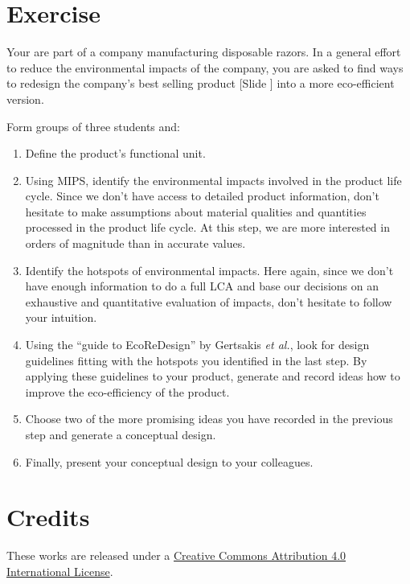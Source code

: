 \documentclass{article}
\newcounter{slide}
\newcounter{exercise}
\begin{document}
\section{Exercise}
\label{sec:exercise}
{\color{PineGreen}
Your are part of a company manufacturing disposable razors. In a general effort to reduce the environmental impacts of the company, you are asked to find ways to redesign the company's best selling product {\color{blue}[Slide ]} into a more eco-efficient version. 

Form groups of three students and:
\begin{enumerate}
	\item Define the product's functional unit. 
	\item Using MIPS, identify the environmental impacts involved in the product life cycle. Since we don't have access to detailed product information, don't hesitate to make assumptions about material qualities and quantities processed in the product life cycle. At this step, we are more interested in orders of magnitude than in accurate values. 
	\item Identify the hotspots of environmental impacts. Here again, since we don't have enough information to do a full LCA and base our decisions on an exhaustive and quantitative evaluation of impacts, don't hesitate to follow your intuition.
	\item Using the ``guide to EcoReDesign'' by Gertsakis \emph{et al.}, look for design guidelines fitting with the hotspots you identified in the last step. By applying these guidelines to your product, generate and record ideas how to improve the eco-efficiency of the product. 
	\item Choose two of the more promising ideas you have recorded in the previous step and generate a conceptual design.
	\item Finally, present your conceptual design to your colleagues. 
\end{enumerate}
}

\section*{Credits}
\label{sec:credits}
These works are released under a \href{https://creativecommons.org/licenses/by/4.0/}{Creative Commons Attribution 4.0 International License}.



\end{document}
